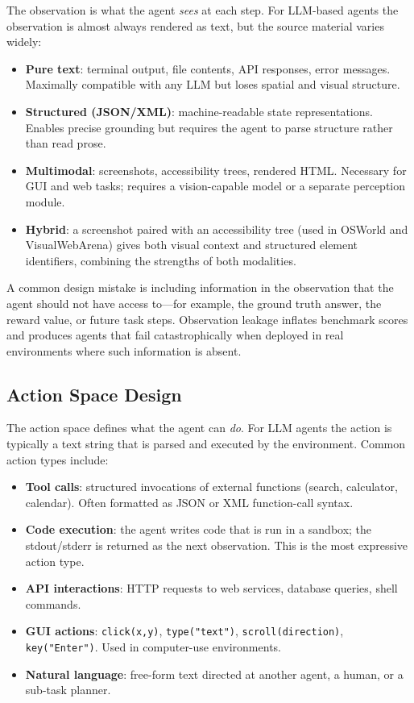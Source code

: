 The observation is what the agent \emph{sees} at each step. For LLM-based agents the observation is almost always rendered as text, but the source material varies widely:

\begin{itemize}
  \item \textbf{Pure text}: terminal output, file contents, API responses, error messages. Maximally compatible with any LLM but loses spatial and visual structure.
  \item \textbf{Structured (JSON/XML)}: machine-readable state representations. Enables precise grounding but requires the agent to parse structure rather than read prose.
  \item \textbf{Multimodal}: screenshots, accessibility trees, rendered HTML. Necessary for GUI and web tasks; requires a vision-capable model or a separate perception module.
  \item \textbf{Hybrid}: a screenshot paired with an accessibility tree (used in OSWorld and VisualWebArena) gives both visual context and structured element identifiers, combining the strengths of both modalities.
\end{itemize}

\begin{warningbox}
A common design mistake is including information in the observation that the agent should not have access to---for example, the ground truth answer, the reward value, or future task steps. Observation leakage inflates benchmark scores and produces agents that fail catastrophically when deployed in real environments where such information is absent.
\end{warningbox}

\subsection{Action Space Design}
\label{action-space-design}

The action space defines what the agent can \emph{do}. For LLM agents the action is typically a text string that is parsed and executed by the environment. Common action types include:

\begin{itemize}
  \item \textbf{Tool calls}: structured invocations of external functions (search, calculator, calendar). Often formatted as JSON or XML function-call syntax.
  \item \textbf{Code execution}: the agent writes code that is run in a sandbox; the stdout/stderr is returned as the next observation. This is the most expressive action type.
  \item \textbf{API interactions}: HTTP requests to web services, database queries, shell commands.
  \item \textbf{GUI actions}: \texttt{click(x,y)}, \texttt{type("text")}, \texttt{scroll(direction)}, \texttt{key("Enter")}. Used in computer-use environments.
  \item \textbf{Natural language}: free-form text directed at another agent, a human, or a sub-task planner.
\end{itemize}

